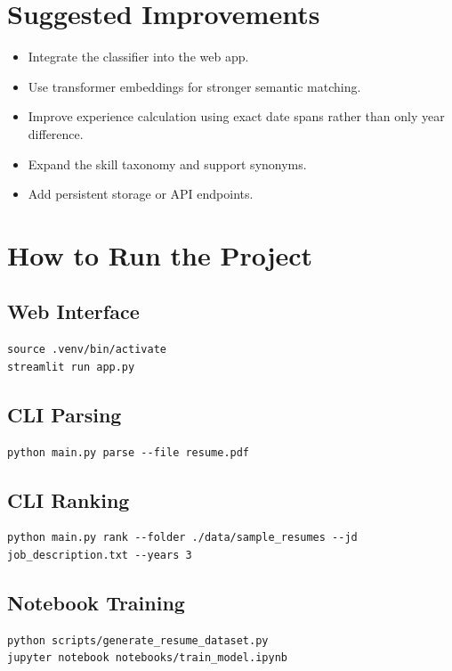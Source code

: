 \documentclass[12pt,a4paper]{article}
\begin{document}
\section{Suggested Improvements}
\begin{itemize}[leftmargin=1.5em]
    \item Integrate the classifier into the web app.
    \item Use transformer embeddings for stronger semantic matching.
    \item Improve experience calculation using exact date spans rather than only year difference.
    \item Expand the skill taxonomy and support synonyms.
    \item Add persistent storage or API endpoints.
\end{itemize}

\section{How to Run the Project}
\subsection{Web Interface}
\begin{verbatim}
source .venv/bin/activate
streamlit run app.py
\end{verbatim}

\subsection{CLI Parsing}
\begin{verbatim}
python main.py parse --file resume.pdf
\end{verbatim}

\subsection{CLI Ranking}
\begin{verbatim}
python main.py rank --folder ./data/sample_resumes --jd job_description.txt --years 3
\end{verbatim}

\subsection{Notebook Training}
\begin{verbatim}
python scripts/generate_resume_dataset.py
jupyter notebook notebooks/train_model.ipynb
\end{verbatim}
\end{document}
